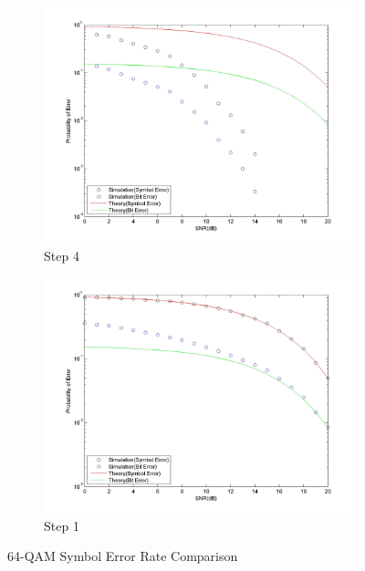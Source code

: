 \documentclass[]{article}
\begin{document}
\begin{figure}[h]
        \centering
        \begin{subfigure}[b]{0.4\textwidth}
                \includegraphics[width=\textwidth]{qam64SNR.jpg}
                \caption{Step 4}
                \label{fig:bpSNR}
        \end{subfigure}%
        \qquad \quad %
        \begin{subfigure}[b]{0.4\textwidth}
                \includegraphics[width=\textwidth]{qam64SNRstep1.jpg}
                \caption{Step 1}
                \label{fig:bpSNR1}
        \end{subfigure}
        \caption{64-QAM Symbol Error Rate Comparison \label{fig:qam64}}
\end{figure}
\end{document}
